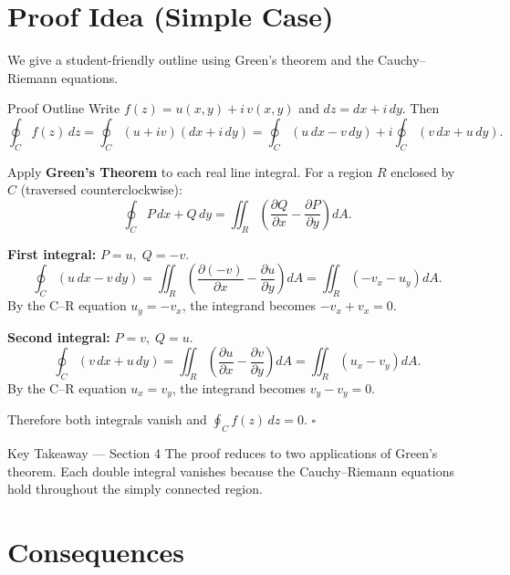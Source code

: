 \documentclass[12pt,a4paper]{article}
\begin{document}
\section{Proof Idea (Simple Case)}

We give a student-friendly outline using Green's theorem and the Cauchy--Riemann equations.

\begin{infobox}{Proof Outline}
Write $f(z) = u(x,y) + i\,v(x,y)$ and $dz = dx + i\,dy$.
Then
\[
  \oint_{C} f(z)\,dz
  = \oint_{C} (u + iv)(dx + i\,dy)
  = \oint_{C} (u\,dx - v\,dy) + i\oint_{C} (v\,dx + u\,dy).
\]

Apply \textbf{Green's Theorem} to each real line integral.
For a region $R$ enclosed by $C$ (traversed counterclockwise):
\[
  \oint_{C} P\,dx + Q\,dy = \iint_{R} \!\left(\frac{\partial Q}{\partial x} - \frac{\partial P}{\partial y}\right) dA.
\]

\textbf{First integral:} $P = u,\; Q = -v$.
\[
  \oint_{C}(u\,dx - v\,dy)
  = \iint_{R}\!\left(\frac{\partial(-v)}{\partial x} - \frac{\partial u}{\partial y}\right)dA
  = \iint_{R}\!\left(-v_x - u_y\right)dA.
\]
By the C--R equation $u_y = -v_x$, the integrand becomes $-v_x + v_x = 0$.

\textbf{Second integral:} $P = v,\; Q = u$.
\[
  \oint_{C}(v\,dx + u\,dy)
  = \iint_{R}\!\left(\frac{\partial u}{\partial x} - \frac{\partial v}{\partial y}\right)dA
  = \iint_{R}\!\left(u_x - v_y\right)dA.
\]
By the C--R equation $u_x = v_y$, the integrand becomes $v_y - v_y = 0$.

Therefore both integrals vanish and $\oint_{C} f(z)\,dz = 0$. \hfill $\square$
\end{infobox}

\begin{learnbox}{Key Takeaway --- Section 4}
The proof reduces to two applications of Green's theorem.
Each double integral vanishes because the Cauchy--Riemann equations hold throughout
the simply connected region.
\end{learnbox}

\section{Consequences}
\end{document}
